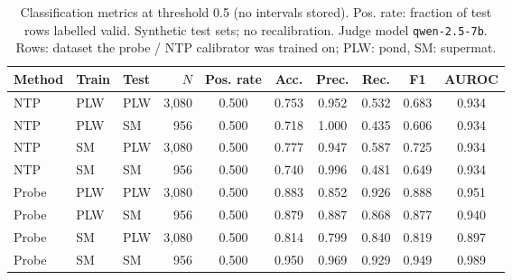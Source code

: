 \begin{table}[t]
\centering
\small
\caption{Classification metrics at threshold 0.5 (no intervals stored). Pos. rate: fraction of test rows labelled valid. Synthetic test sets; no recalibration. Judge model \texttt{qwen-2.5-7b}. Rows: dataset the probe / NTP calibrator was trained on; PLW: pond, SM: supermat.}
\label{tab:calibration-validated-syn-classification}
\begin{tabular}{lllrcccccc}
\toprule
Method & Train & Test & $N$ & Pos. rate & Acc. & Prec. & Rec. & F1 & AUROC \\
\midrule
NTP & PLW & PLW & 3{,}080 & 0.500 & 0.753 & 0.952 & 0.532 & 0.683 & 0.934 \\
NTP & PLW & SM & 956 & 0.500 & 0.718 & 1.000 & 0.435 & 0.606 & 0.934 \\
NTP & SM & PLW & 3{,}080 & 0.500 & 0.777 & 0.947 & 0.587 & 0.725 & 0.934 \\
NTP & SM & SM & 956 & 0.500 & 0.740 & 0.996 & 0.481 & 0.649 & 0.934 \\
\midrule
Probe & PLW & PLW & 3{,}080 & 0.500 & 0.883 & 0.852 & 0.926 & 0.888 & 0.951 \\
Probe & PLW & SM & 956 & 0.500 & 0.879 & 0.887 & 0.868 & 0.877 & 0.940 \\
Probe & SM & PLW & 3{,}080 & 0.500 & 0.814 & 0.799 & 0.840 & 0.819 & 0.897 \\
Probe & SM & SM & 956 & 0.500 & 0.950 & 0.969 & 0.929 & 0.949 & 0.989 \\
\bottomrule
\end{tabular}
\end{table}
